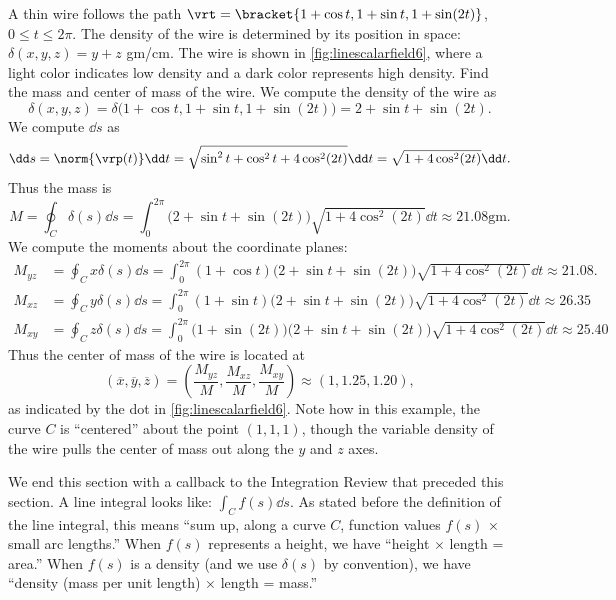 \begin{example}\label{ex_linescalarfield6}%
A
%
%
thin wire follows the path $\vrt =\bracket{1+\cos t,1+\sin t, 1+ \sin(2t)}$, $0\leq t\leq 2\pi$. The density of the wire is determined by its position in space: $\delta(x,y,z) = y+z$ gm/cm. The wire is shown in \autoref{fig:linescalarfield6}, where a light color indicates low density and a dark color represents high density. Find the mass  and center of mass of the wire.
\solution
We compute the density of the wire as 
\[
\delta(x,y,z) = \delta\bigl(1+\cos t,1+\sin t, 1+\sin(2t)\bigr) = 2+\sin t+\sin(2t).
\]
We compute $\dd s$ as
\[
\dd s = \norm{\vrp(t)}\dd t = \sqrt{\sin^2t+\cos^2t+4\cos^2(2t)}\dd t
= \sqrt{1+4\cos^2(2t)}\dd t.
\]
Thus the mass is
\[
M = \oint_C \delta(s)\dd s = \int_0^{2\pi} \bigl(2+\sin t+\sin(2t)\bigr)\sqrt{1+4\cos^2(2t)}\dd t
\approx 21.08\text{gm}.
\]
We compute the moments about the coordinate planes:
{\small
\begin{align*}
M_{yz} &= \oint_C x\delta(s)\dd s = \int_0^{2\pi}\!\!(1+\cos t)\bigl(2+\sin t+\sin(2t)\bigr)\sqrt{1+4\cos^2(2t)}\dd t \approx 21.08. \\
M_{xz} &= \oint_C y\delta(s)\dd s = \int_0^{2\pi}\!\!(1+\sin t)\bigl(2+\sin t+\sin(2t)\bigr)\sqrt{1+4\cos^2(2t)}\dd t \approx
26.35\\
M_{xy} &= \oint_C z\delta(s)\dd s = \int_0^{2\pi}\!\!\bigl(1+\sin(2 t)\bigr)\bigl(2+\sin t+\sin(2t)\bigr)\sqrt{1+4\cos^2(2t)}\dd t \approx 25.40
\end{align*}}
Thus the center of mass of the wire is located at 
\[
(\overline{x},\overline{y},\overline{z})
=\left(\frac{M_{yz}}M, \frac{M_{xz}}M,\frac{M_{xy}}M\right) \approx (1,1.25,1.20),
\]
as indicated by the dot in \autoref{fig:linescalarfield6}. Note how in this example, the curve $C$ is ``centered'' about the point $(1,1,1)$, though the variable density of the wire pulls the center of mass out along the $y$ and $z$ axes.
\end{example}

We end this section with a callback to the Integration Review that preceded this section. A line integral looks like: $\int_C f(s)\dd s$. As stated before the definition of the line integral, this means ``sum up, along a curve $C$, function values $f(s)$ $\times$ small arc lengths.'' When $f(s)$ represents a height, we have ``height $\times$ length = area.'' When $f(s)$ is a density (and we use $\delta(s)$ by convention), we have ``density (mass per unit length) $\times$ length = mass.''

